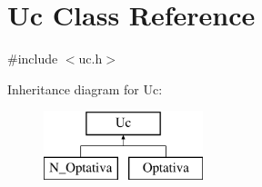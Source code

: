 \hypertarget{class_uc}{}\section{Uc Class Reference}
\label{class_uc}


{\ttfamily \#include $<$uc.\+h$>$}

Inheritance diagram for Uc\+:\begin{figure}[H]
\begin{center}
\leavevmode
\includegraphics[height=2.000000cm]{class_uc}
\end{center}
\end{figure}
